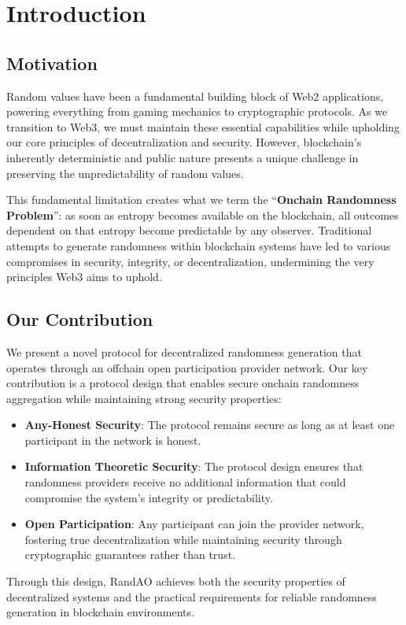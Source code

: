 \section{Introduction}\label{sec:introduction}


\subsection{Motivation}\label{sec:motivation}

Random values have been a fundamental building block of Web2 applications, powering everything from gaming mechanics to cryptographic protocols. As we transition to Web3, we must maintain these essential capabilities while upholding our core principles of decentralization and security. However, blockchain's inherently deterministic and public nature presents a unique challenge in preserving the unpredictability of random values.

This fundamental limitation creates what we term the ``\textbf{Onchain Randomness Problem}'': as soon as entropy becomes available on the blockchain, all outcomes dependent on that entropy become predictable by any observer. Traditional attempts to generate randomness within blockchain systems have led to various compromises in security, integrity, or decentralization, undermining the very principles Web3 aims to uphold.

\subsection{Our Contribution}\label{sec:our_contribution}

We present a novel protocol for decentralized randomness generation that operates through an offchain open participation provider network. Our key contribution is a protocol design that enables secure onchain randomness aggregation while maintaining strong security properties:

\begin{itemize}
    \item \textbf{Any-Honest Security}: The protocol remains secure as long as at least one participant in the network is honest.
    
    \item \textbf{Information Theoretic Security}: The protocol design ensures that randomness providers receive no additional information that could compromise the system's integrity or predictability.
    
    \item \textbf{Open Participation}: Any participant can join the provider network, fostering true decentralization while maintaining security through cryptographic guarantees rather than trust.
\end{itemize}

Through this design, RandAO achieves both the security properties of decentralized systems and the practical requirements for reliable randomness generation in blockchain environments.

